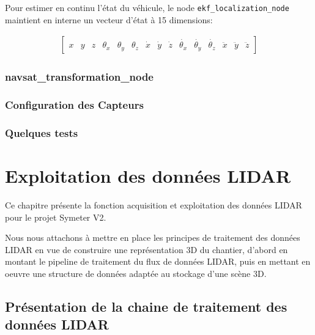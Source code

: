 \documentclass[12pt,a4paper]{report}
\begin{document}
	\para Pour estimer en continu l'état du véhicule, le node \verb|ekf_localization_node| maintient en interne un vecteur d'état à 15 dimensions:
	
	\begin{gather}
		\begin{bmatrix}
			x&y&z&\theta_x&\theta_y&\theta_z&
			\dot{x}&\dot{y}&\dot{z}&\dot{\theta_x}&\dot{\theta_y}&\dot{\theta_z} &\ddot{x}&\ddot{y}&\ddot{z}
		\end{bmatrix}
	\end{gather}
	
	\subsection{navsat\_transformation\_node}
	
	\subsection{Configuration des Capteurs}
	
	\subsection{Quelques tests}
	
	
\chapter{Exploitation des données LIDAR}

Ce chapitre présente la fonction acquisition et exploitation des données LIDAR pour le projet Symeter V2. 

\para Nous nous attachons à mettre en place les principes de traitement des données LIDAR en vue de construire une représentation 3D du chantier, d'abord en montant le pipeline de traitement du flux de données LIDAR, puis en mettant en oeuvre une structure de données adaptée au stockage d'une scène 3D.

	\section{Présentation de la chaine de traitement des données LIDAR}
	
\end{document}

